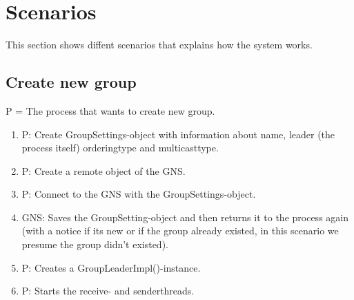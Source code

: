 \documentclass[titlepage, twocolumn, a4paper, 10pt]{article}
\begin{document}
\section{Scenarios}\label{sec:scenarios}
This section shows diffent scenarios that explains how the system
works.

\subsection{Create new group}
P = The process that wants to create new group.
\begin{enumerate}
\item P: Create GroupSettings-object with information about name,
  leader (the process itself) orderingtype and multicasttype.
\item P: Create a remote object of the GNS.
\item P: Connect to the GNS with the GroupSettings-object.
\item GNS: Saves the GroupSetting-object and then returns it to the
  process again (with a notice if its new or if the group already
  existed, in this scenario we presume the group didn’t existed).
\item P: Creates a GroupLeaderImpl()-instance.
\item P: Starts the receive- and senderthreads.
\end{enumerate}
\end{document}
